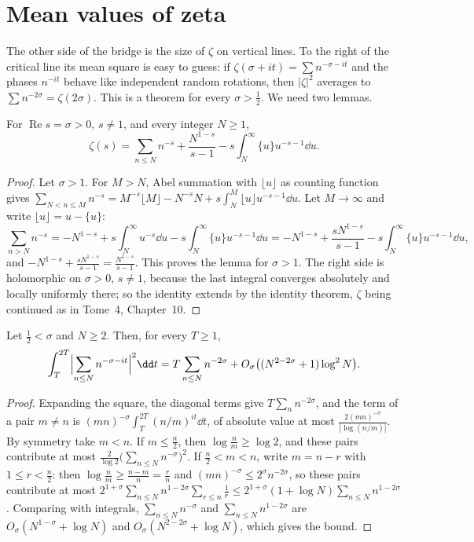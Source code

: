 \section{Mean values of zeta}

The other side of the bridge is the size of $\zeta$ on vertical lines. To the right of the critical line its mean square is easy to guess: if
$\zeta(\sigma+it)=\sum n^{-\sigma-it}$ and the phases $n^{-it}$ behave like independent random rotations, then $|\zeta|^2$ averages to
$\sum n^{-2\sigma}=\zeta(2\sigma)$. This is a theorem for every $\sigma>\frac12$. We need two lemmas.

\begin{lemma}\label{lem:zetaapprox}
For $\operatorname{Re}s=\sigma>0$, $s\ne1$, and every integer $N\ge1$,
\[
\zeta(s)=\sum_{n\le N}n^{-s}+\frac{N^{1-s}}{s-1}-s\int_N^\infty\{u\}u^{-s-1}\dd u.
\]
\end{lemma}
\begin{proof}
Let $\sigma>1$. For $M>N$, Abel summation with $\lfloor u\rfloor$ as counting function gives
$\sum_{N<n\le M}n^{-s}=M^{-s}\lfloor M\rfloor-N^{-s}N+s\int_N^M\lfloor u\rfloor u^{-s-1}\dd u$. Let $M\to\infty$ and write $\lfloor u\rfloor=u-\{u\}$:
\[
\sum_{n>N}n^{-s}=-N^{1-s}+s\int_N^\infty u^{-s}\dd u-s\int_N^\infty\{u\}u^{-s-1}\dd u=-N^{1-s}+\frac{sN^{1-s}}{s-1}-s\int_N^\infty\{u\}u^{-s-1}\dd u,
\]
and $-N^{1-s}+\frac{sN^{1-s}}{s-1}=\frac{N^{1-s}}{s-1}$. This proves the lemma for $\sigma>1$. The right side is holomorphic on $\sigma>0$, $s\ne1$, because the last
integral converges absolutely and locally uniformly there; so the identity extends by the identity theorem, $\zeta$ being continued as in Tome~4,
Chapter~10.
\end{proof}

\begin{lemma}\label{lem:dirmeanvalue}
Let $\frac12<\sigma$ and $N\ge2$. Then, for every $T\ge1$,
\[
\int_T^{2T}\Bigl|\sum_{n\le N}n^{-\sigma-it}\Bigr|^2\dd t=T\sum_{n\le N}n^{-2\sigma}+O_\sigma\bigl((N^{2-2\sigma}+1)\log^2N\bigr).
\]
\end{lemma}
\begin{proof}
Expanding the square, the diagonal terms give $T\sum_nn^{-2\sigma}$, and the term of a pair $m\ne n$ is $(mn)^{-\sigma}\int_T^{2T}(n/m)^{it}\dd t$, of absolute value at
most $\frac{2(mn)^{-\sigma}}{|\log(n/m)|}$. By symmetry take $m<n$. If $m\le\frac n2$, then $\log\frac nm\ge\log2$, and these pairs contribute at most
$\frac2{\log2}\bigl(\sum_{n\le N}n^{-\sigma}\bigr)^2$. If $\frac n2<m<n$, write $m=n-r$ with $1\le r<\frac n2$: then $\log\frac nm\ge\frac{n-m}n=\frac rn$ and
$(mn)^{-\sigma}\le2^\sigma n^{-2\sigma}$, so these pairs contribute at most $2^{1+\sigma}\sum_{n\le N}n^{1-2\sigma}\sum_{r\le n}\frac1r\le2^{1+\sigma}(1+\log N)\sum_{n\le N}n^{1-2\sigma}$.
Comparing with integrals, $\sum_{n\le N}n^{-\sigma}$ and $\sum_{n\le N}n^{1-2\sigma}$ are $O_\sigma(N^{1-\sigma}+\log N)$ and $O_\sigma(N^{2-2\sigma}+\log N)$, which gives the bound.
\end{proof}

